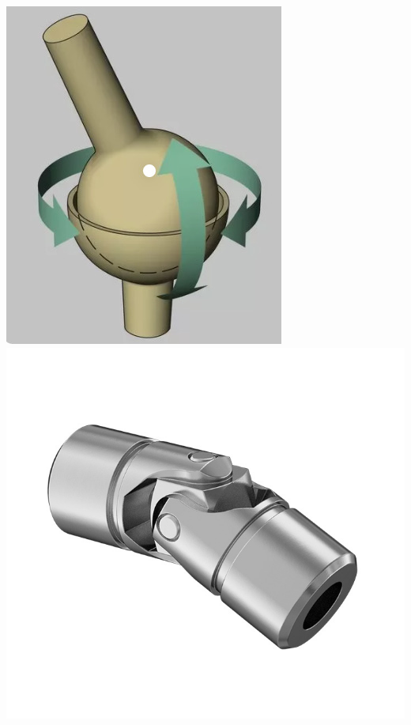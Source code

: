 \begin{frame}
\begin{columns}
\begin{column}{.25\linewidth}
			\includegraphics[width=\textwidth]{figures/spherical.jpg}
			\includegraphics[width=\textwidth]{figures/ujoint.jpg}	
		\end{column}
	\end{columns}	
\end{frame}

